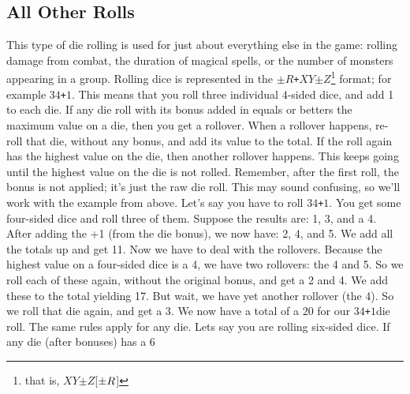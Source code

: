 \documentclass[twoside]{book}
\begin{document}
\subsection{All Other Rolls}
     This type of die rolling is used for just about
               everything else in the game: rolling damage from combat,
               the duration of magical spells, or the number of monsters
               appearing in a group.  Rolling dice is represented in the
                \texttt{\ensuremath{\pm}}\ensuremath{R}\texttt{+}\ensuremath{X}\ensuremath{Y}\texttt{\ensuremath{\pm}}\ensuremath{Z}\footnote{ that is,
                \ensuremath{X}\ensuremath{Y}\texttt{\ensuremath{\pm}}\ensuremath{Z}[\ensuremath{\texttt{\ensuremath{\pm}}\ensuremath{R}}]} format; for
               example \ensuremath{3}\ensuremath{4}\texttt{+}\ensuremath{1}. This means that you roll three individual
               4-sided dice, and add 1 to each die.  If any die roll with its bonus added in equals or
               betters the maximum value on a die, then you get a
               rollover. When a rollover happens, re-roll that die,
               without any bonus, and add its value to the total. If the
               roll again has the highest value on the die, then another
               rollover happens. This keeps going until the highest value
               on the die is not rolled. Remember, after the first roll,
               the bonus is not applied; it's just the raw die
               roll.  This may sound confusing, so we'll work with
               the example from above. Let's say you have to roll
               \ensuremath{3}\ensuremath{4}\texttt{+}\ensuremath{1}. You get some four-sided dice and roll three of
               them. Suppose the results are: 1, 3, and a 4. After adding
               the +1 (from the die bonus), we now have: 2, 4, and 5. We
               add all the totals up and get 11. Now we have to deal with
               the rollovers. Because the highest value on a four-sided
               dice is a 4, we have two rollovers: the 4 and 5. So we
               roll each of these again, without the original bonus, and
               get a 2 and 4. We add these to the total yielding 17. But
               wait, we have yet another rollover (the 4). So we roll
               that die again, and get a 3. We now have a total of a 20
               for our \ensuremath{3}\ensuremath{4}\texttt{+}\ensuremath{1}die roll.  The same rules apply for any die. Lets say you are
               rolling six-sided dice. If any die (after bonuses) has a 6
\end{document}
